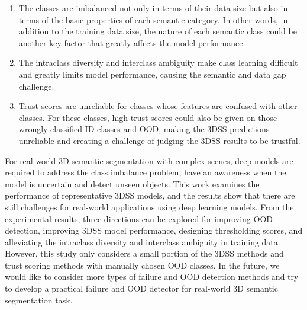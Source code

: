 \documentclass[journal]{IEEEtran}
\begin{document}
\begin{enumerate}
	\item The classes are imbalanced not only in terms of their data size but also in terms of the basic properties of each semantic category. In other words, in addition to the training data size, the nature of each semantic class could be another key factor that greatly affects the model performance.
	
	\item The intraclass diversity and interclass ambiguity make class learning difficult and greatly limits model performance, causing the semantic and data gap challenge.
	
	\item Trust scores are unreliable for classes whose features are confused with other classes. For these classes, high trust scores could also be given on those wrongly classified ID classes and OOD, making the 3DSS predictions unreliable and creating a challenge of judging the 3DSS results to be trustful.
	
\end{enumerate}

For real-world 3D semantic segmentation with complex scenes, deep models are required to address the class imbalance problem, have an awareness when the model is uncertain and detect unseen objects. This work examines the performance of representative 3DSS models, and the results show that there are still challenges for real-world applications using deep learning models. From the experimental results, three directions can be explored for improving OOD detection, improving 3DSS model performance, designing thresholding scores, and alleviating the intraclass diversity and interclass ambiguity in training data. However, this study only considers a small portion of the 3DSS methods and trust scoring methods with manually chosen OOD classes. In the future, we would like to consider more types of failure and OOD detection methods and try to develop a practical failure and OOD detector for real-world 3D semantic segmentation task.






\end{document}
